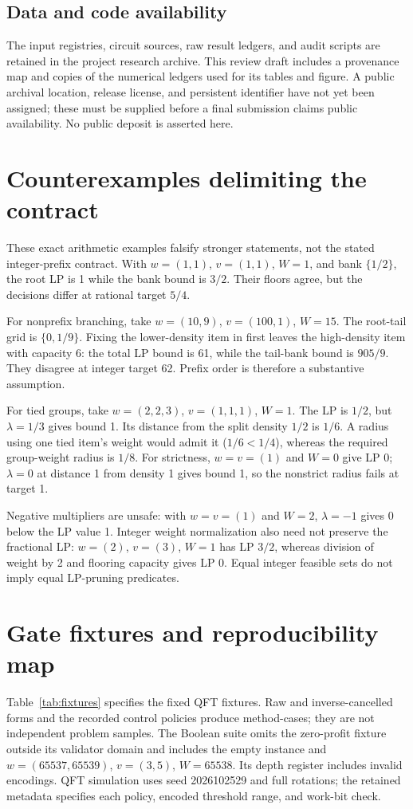 \documentclass[referee,pdflatex,sn-mathphys-num]{sn-jnl}
\theoremstyle{thmstyleone}
\theoremstyle{thmstyletwo}
\begin{document}
\subsection*{Data and code availability}
The input registries, circuit sources, raw result ledgers, and audit scripts are retained in the project research archive. This review draft includes a provenance map and copies of the numerical ledgers used for its tables and figure. A public archival location, release license, and persistent identifier have not yet been assigned; these must be supplied before a final submission claims public availability. No public deposit is asserted here.

\appendix
\section{Counterexamples delimiting the contract}\label{app:counterexamples}
These exact arithmetic examples falsify stronger statements, not the stated integer-prefix contract. With $w=(1,1)$, $v=(1,1)$, $W=1$, and bank $\{1/2\}$, the root LP is 1 while the bank bound is $3/2$. Their floors agree, but the decisions differ at rational target $5/4$.

For nonprefix branching, take $w=(10,9)$, $v=(100,1)$, $W=15$. The root-tail grid is $\{0,1/9\}$. Fixing the lower-density item in first leaves the high-density item with capacity 6: the total LP bound is 61, while the tail-bank bound is $905/9$. They disagree at integer target 62. Prefix order is therefore a substantive assumption.

For tied groups, take $w=(2,2,3)$, $v=(1,1,1)$, $W=1$. The LP is $1/2$, but $\lambda=1/3$ gives bound 1. Its distance from the split density $1/2$ is $1/6$. A radius using one tied item's weight would admit it ($1/6<1/4$), whereas the required group-weight radius is $1/8$. For strictness, $w=v=(1)$ and $W=0$ give LP 0; $\lambda=0$ at distance 1 from density 1 gives bound 1, so the nonstrict radius fails at target 1.

Negative multipliers are unsafe: with $w=v=(1)$ and $W=2$, $\lambda=-1$ gives 0 below the LP value 1. Integer weight normalization also need not preserve the fractional LP: $w=(2)$, $v=(3)$, $W=1$ has LP $3/2$, whereas division of weight by 2 and flooring capacity gives LP 0. Equal integer feasible sets do not imply equal LP-pruning predicates.

\section{Gate fixtures and reproducibility map}\label{app:reproduce}
Table~\ref{tab:fixtures} specifies the fixed QFT fixtures. Raw and inverse-cancelled forms and the recorded control policies produce method-cases; they are not independent problem samples. The Boolean suite omits the zero-profit fixture outside its validator domain and includes the empty instance and $w=(65537,65539)$, $v=(3,5)$, $W=65538$. Its depth register includes invalid encodings. QFT simulation uses seed 2026102529 and full rotations; the retained metadata specifies each policy, encoded threshold range, and work-bit check.
\end{document}
